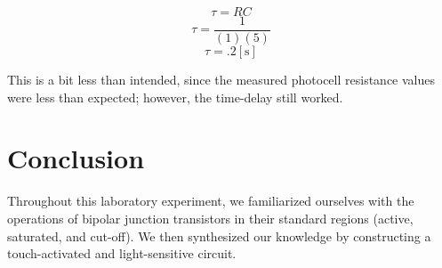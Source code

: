 \documentclass[
	letterpaper, %
	10pt, %
]{CSUniSchoolLabReport}
\begin{document}
$$\tau=RC$$
$$\tau=\frac{1}{(1)(5)}$$
$$\boxed{\tau=.2[\si{\second}]}$$

This is a bit less than intended, since the measured photocell resistance values were less than expected; however, the time-delay still worked.

\section{Conclusion}

Throughout this laboratory experiment, we familiarized ourselves with the operations of bipolar junction transistors in their standard regions (active, saturated, and cut-off). We then synthesized our knowledge by constructing a touch-activated and light-sensitive circuit.
\end{document}
